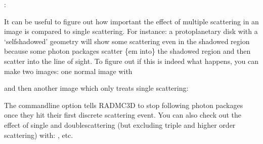 \documentclass[letterpaper,10pt,english]{sphinxmanual}
\begin{document}
 
 
 :

\begin{sphinxVerbatim}[commandchars=\\\{\}]
  
\end{sphinxVerbatim}


It can be useful to figure out how important the effect of
multiple scattering in an image is compared to single scattering. For
instance: a protoplanetary disk with a ‘self\sphinxhyphen{}shadowed’ geometry will
show some scattering even in the shadowed region because some photon
packages scatter \{em into\} the shadowed region and then scatter into
the line of sight. To figure out if this is indeed what happens, you
can make two images: one normal image with

\begin{sphinxVerbatim}[commandchars=\\\{\}]
   
  
\end{sphinxVerbatim}

and then another image which only treats single scattering:

\begin{sphinxVerbatim}[commandchars=\\\{\}]
     
  
\end{sphinxVerbatim}

The command\sphinxhyphen{}line option  tells RADMC\sphinxhyphen{}3D to stop following photon
packages once they hit their first discrete scattering event. You can also check
out the effect of single\sphinxhyphen{} and double\sphinxhyphen{}scattering (but excluding triple and higher
order scattering) with: , etc.
\end{document}
